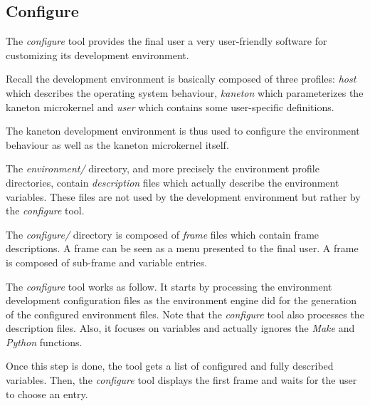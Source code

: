 %
%
%
%
%
%

%
%

\subsection{Configure}
\label{section:configure}

The \textit{configure} tool provides the final user a very user-friendly
software for customizing its development environment.

Recall the development environment is basically composed of three profiles:
\textit{host} which describes the operating system behaviour, \textit{kaneton}
which parameterizes the kaneton microkernel and \textit{user} which contains
some user-specific definitions.

The kaneton development environment is thus used to configure the environment
behaviour as well as the kaneton microkernel itself.

The \textit{environment/} directory, and more precisely the environment
profile directories, contain \textit{description} files which actually
describe the environment variables. These files are not used by the development
environment but rather by the \textit{configure} tool.

The \textit{configure/} directory is composed of \textit{frame} files
which contain frame descriptions. A frame can be seen as a menu presented
to the final user. A frame is composed of sub-frame and variable entries.

The \textit{configure} tool works as follow. It starts by processing the
environment development configuration files as the environment engine did
for the generation of the configured environment files. Note that the
\textit{configure} tool also processes the description files. Also, it
focuses on variables and actually ignores the \textit{Make} and \textit{Python}
functions.

Once this step is done, the tool gets a list of configured and fully described
variables. Then, the \textit{configure} tool displays the first frame and
waits for the user to choose an entry.


